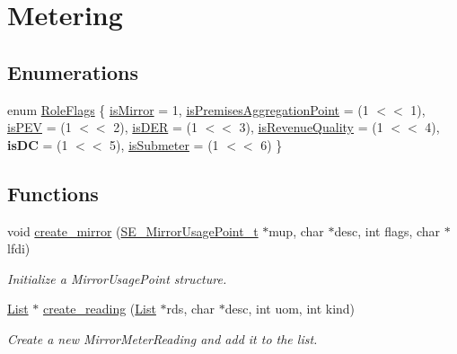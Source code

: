 \hypertarget{group__metering}{}\section{Metering}
\label{group__metering}
\subsection*{Enumerations}
\begin{DoxyCompactItemize}
\item 
enum \hyperlink{group__metering_gab0fd19d6dbdfff825c669e43fc4f2cbe}{Role\+Flags} \{ \newline
\hyperlink{group__metering_ggab0fd19d6dbdfff825c669e43fc4f2cbea6828f4696d930aa921eca21ae642b1a2}{is\+Mirror} = 1, 
\newline
\hyperlink{group__metering_ggab0fd19d6dbdfff825c669e43fc4f2cbeae06974b7bb65c103acace906efec9912}{is\+Premises\+Aggregation\+Point} = (1 $<$$<$ 1), 
\newline
\hyperlink{group__metering_ggab0fd19d6dbdfff825c669e43fc4f2cbea995e5648a17931f016c740b2e0ddb0a2}{is\+P\+EV} = (1 $<$$<$ 2), 
\newline
\hyperlink{group__metering_ggab0fd19d6dbdfff825c669e43fc4f2cbeabd5e19091655e41979efdec7d141f02c}{is\+D\+ER} = (1 $<$$<$ 3), 
\newline
\hyperlink{group__metering_ggab0fd19d6dbdfff825c669e43fc4f2cbea4b162a7882183e4b22091ea7ef3905d3}{is\+Revenue\+Quality} = (1 $<$$<$ 4), 
\newline
{\bfseries is\+DC} = (1 $<$$<$ 5), 
\newline
\hyperlink{group__metering_ggab0fd19d6dbdfff825c669e43fc4f2cbeaa02b2e6d34db0c84ebf803a683663ed3}{is\+Submeter} = (1 $<$$<$ 6)
 \}
\end{DoxyCompactItemize}
\subsection*{Functions}
\begin{DoxyCompactItemize}
\item 
void \hyperlink{group__metering_gac0c4d2e92df6808d560e724eaf7a9328}{create\+\_\+mirror} (\hyperlink{structSE__MirrorUsagePoint__t}{S\+E\+\_\+\+Mirror\+Usage\+Point\+\_\+t} $\ast$mup, char $\ast$desc, int flags, char $\ast$lfdi)
\begin{DoxyCompactList}\small\item\em Initialize a Mirror\+Usage\+Point structure. \end{DoxyCompactList}\item 
\hyperlink{structList}{List} $\ast$ \hyperlink{group__metering_ga22473d12cfe58259f79ca148451b3382}{create\+\_\+reading} (\hyperlink{structList}{List} $\ast$rds, char $\ast$desc, int uom, int kind)
\begin{DoxyCompactList}\small\item\em Create a new Mirror\+Meter\+Reading and add it to the list. \end{DoxyCompactList}\end{DoxyCompactItemize}


